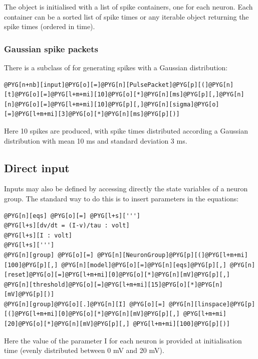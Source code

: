 \documentclass[letterpaper,10pt,english]{manual}
\begin{document}
The object is initialised with a list of spike containers, one for each neuron.
Each container can be a sorted list of spike times or any iterable object returning
the spike times (ordered in time).


\subsubsection{Gaussian spike packets}

There is a subclass of \hyperlink{brian.SpikeGeneratorGroup}{} for generating spikes with a Gaussian
distribution:

\begin{Verbatim}[commandchars=@\[\]]
@PYG[n+nb][input]@PYG[o][=]@PYG[n][PulsePacket]@PYG[p][(]@PYG[n][t]@PYG[o][=]@PYG[l+m+mi][10]@PYG[o][*]@PYG[n][ms]@PYG[p][,]@PYG[n][n]@PYG[o][=]@PYG[l+m+mi][10]@PYG[p][,]@PYG[n][sigma]@PYG[o][=]@PYG[l+m+mi][3]@PYG[o][*]@PYG[n][ms]@PYG[p][)]
\end{Verbatim}

Here 10 spikes are produced, with spike times distributed according a Gaussian distribution with
mean 10 ms and standard deviation 3 ms.


\subsection{Direct input}

Inputs may also be defined by accessing directly the state variables of a neuron group. The standard way
to do this is to insert parameters in the equations:

\begin{Verbatim}[commandchars=@\[\]]
@PYG[n][eqs] @PYG[o][=] @PYG[l+s][''']
@PYG[l+s][dv/dt = (I-v)/tau : volt]
@PYG[l+s][I : volt]
@PYG[l+s][''']
@PYG[n][group] @PYG[o][=] @PYG[n][NeuronGroup]@PYG[p][(]@PYG[l+m+mi][100]@PYG[p][,] @PYG[n][model]@PYG[o][=]@PYG[n][eqs]@PYG[p][,] @PYG[n][reset]@PYG[o][=]@PYG[l+m+mi][0]@PYG[o][*]@PYG[n][mV]@PYG[p][,] @PYG[n][threshold]@PYG[o][=]@PYG[l+m+mi][15]@PYG[o][*]@PYG[n][mV]@PYG[p][)]
@PYG[n][group]@PYG[o][.]@PYG[n][I] @PYG[o][=] @PYG[n][linspace]@PYG[p][(]@PYG[l+m+mi][0]@PYG[o][*]@PYG[n][mV]@PYG[p][,] @PYG[l+m+mi][20]@PYG[o][*]@PYG[n][mV]@PYG[p][,] @PYG[l+m+mi][100]@PYG[p][)]
\end{Verbatim}

Here the value of the parameter I for each neuron is provided at initialisation time
(evenly distributed between 0 mV and 20 mV).
\end{document}
